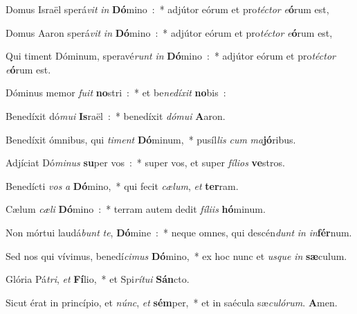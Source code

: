 \item Domus Israël sperá\emph{vit} \emph{in} \textbf{Dó}\-mino~:~* adjútor eórum et pro\emph{té}\-\emph{ctor} \emph{e}\-\textbf{ó}\-rum est,
\item Domus Aaron sperá\emph{vit} \emph{in} \textbf{Dó}\-mino~:~* adjútor eórum et pro\emph{té}\-\emph{ctor} \emph{e}\-\textbf{ó}\-rum est,
\item Qui timent Dóminum, speravé\emph{runt} \emph{in} \textbf{Dó}\-mino~:~* adjútor eórum et pro\emph{té}\-\emph{ctor} \emph{e}\-\textbf{ó}\-rum est.
\item Dóminus memor \emph{fu}\-\emph{it} \textbf{no}\-stri~:~* et be\emph{ne}\-\emph{dí}\-\emph{xit} \textbf{no}\-bis~:
\item Benedíxit dó\emph{mu}\-\emph{i} \textbf{Is}\-raël~:~* benedíxit \emph{dó}\-\emph{mu}\-\emph{i} \textbf{A}\-aron.
\item Benedíxit ómnibus, qui \emph{ti}\-\emph{ment} \textbf{Dó}\-minum,~* pu\-síl\-\emph{lis} \emph{cum} \emph{ma}\-\textbf{jó}\-ribus.
\item Adjíciat Dó\emph{mi}\-\emph{nus} \textbf{su}\-per vos~:~* super vos, et super \emph{fí}\-\emph{li}\-\emph{os} \textbf{ve}\-stros.
\item Benedícti \emph{vos} \emph{a} \textbf{Dó}\-mino,~* qui fecit \emph{cæ}\-\emph{lum}, \emph{et} \textbf{ter}\-ram.
\item Cælum \emph{cæ}\-\emph{li} \textbf{Dó}\-mino~:~* terram autem dedit \emph{fí}\-\emph{li}\-\emph{is} \textbf{hó}\-mi\-num.
\item Non mórtui laudá\emph{bunt} \emph{te}, \textbf{Dó}\-mine~:~* neque omnes, qui descén\emph{dunt} \emph{in} \emph{in}\-\textbf{fér}\-num.
\item Sed nos qui vívimus, benedí\emph{ci}\-\emph{mus} \textbf{Dó}\-mino,~* ex hoc nunc et \emph{us}\-\emph{que} \emph{in} \textbf{sæ}\-culum.
\item Glória Pá\emph{tri}, \emph{et} \textbf{Fí}\-lio,~* et Spi\emph{rí}\-\emph{tu}\-\emph{i} \textbf{Sán}\-cto.
\item Sicut érat in princípio, et \emph{núnc}, \emph{et} \textbf{sém}\-per,~* et in saécula sæ\emph{cu}\-\emph{ló}\-\emph{rum}. \textbf{A}\-men.
